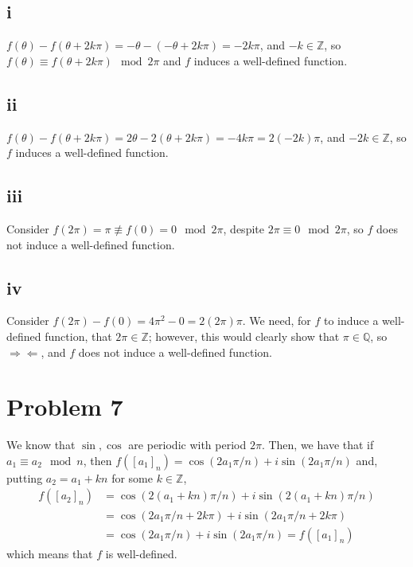 \documentclass[12pt,letterpaper]{article}
\theoremstyle{definition}
\newcommand{\contra}{\Rightarrow\!\Leftarrow}
\newcommand{\Z}{\mathbb{Z}}
\newcommand{\Q}{\mathbb{Q}}
\begin{document}
\subsection*{i}

$f(\theta) - f(\theta + 2k\pi) = -\theta - (-\theta + 2k\pi) = -2k\pi$, and $-k \in \Z$, so $f(\theta) \equiv f(\theta + 2k\pi) \mod 2\pi$ and $f$ induces a well-defined function.

\subsection*{ii}

$f(\theta) - f(\theta + 2k\pi) = 2\theta - 2(\theta + 2k\pi) = -4k\pi = 2(-2k)\pi$, and $-2k \in \Z$, so $f$ induces a well-defined function.

\subsection*{iii}

Consider $f(2\pi) = \pi \not\equiv f(0) = 0 \mod 2\pi$, despite $2\pi \equiv 0 \mod 2\pi$, so $f$ does not induce a well-defined function.

\subsection*{iv}

Consider $f(2\pi) - f(0) = 4\pi^2  - 0 = 2(2\pi)\pi$. We need, for $f$ to induce a well-defined function, that $2\pi \in \Z$; however, this would clearly show that $\pi \in \Q$, so $\contra$, and $f$ does not induce a well-defined function.

\section*{Problem 7}

We know that $\sin, \cos$ are periodic with period $2\pi$. Then, we have that if $a_1 \equiv a_2 \mod n$, then $f([a_1]_n) = \cos(2a_1\pi / n) + i\sin(2a_1\pi / n)$ and, putting $a_2 = a_1 + kn$ for some $k \in \Z$, 
\begin{align*}
  f([a_2]_n) &= \cos(2(a_1 + kn)\pi / n) + i\sin(2(a_1 + kn)\pi / n) \\
             &= \cos(2a_1\pi / n + 2k\pi) + i\sin(2a_1\pi / n + 2k\pi) \\ 
             &= \cos(2a_1\pi / n) + i\sin(2a_1\pi / n) = f([a_1]_n)
\end{align*}
which means that $f$ is well-defined.
\end{document}
